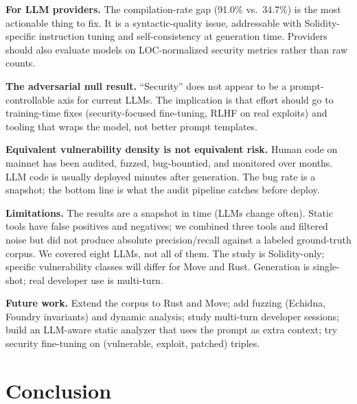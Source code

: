 \documentclass[11pt]{article}
\begin{document}
\textbf{For LLM providers.} The compilation-rate gap (91.0\% vs.\ 34.7\%) is the most actionable thing to fix. It is a syntactic-quality issue, addressable with Solidity-specific instruction tuning and self-consistency at generation time. Providers should also evaluate models on LOC-normalized security metrics rather than raw counts.

\textbf{The adversarial null result.} ``Security'' does not appear to be a prompt-controllable axis for current LLMs. The implication is that effort should go to training-time fixes (security-focused fine-tuning, RLHF on real exploits) and tooling that wraps the model, not better prompt templates.

\textbf{Equivalent vulnerability density is not equivalent risk.} Human code on mainnet has been audited, fuzzed, bug-bountied, and monitored over months. LLM code is usually deployed minutes after generation. The bug rate is a snapshot; the bottom line is what the audit pipeline catches before deploy.

\textbf{Limitations.} The results are a snapshot in time (LLMs change often). Static tools have false positives and negatives; we combined three tools and filtered noise but did not produce absolute precision/recall against a labeled ground-truth corpus. We covered eight LLMs, not all of them. The study is Solidity-only; specific vulnerability classes will differ for Move and Rust. Generation is single-shot; real developer use is multi-turn.

\textbf{Future work.} Extend the corpus to Rust and Move; add fuzzing (Echidna, Foundry invariants) and dynamic analysis; study multi-turn developer sessions; build an LLM-aware static analyzer that uses the prompt as extra context; try security fine-tuning on (vulnerable, exploit, patched) triples.

\section{Conclusion}
\label{sec:conclusion}
\end{document}
